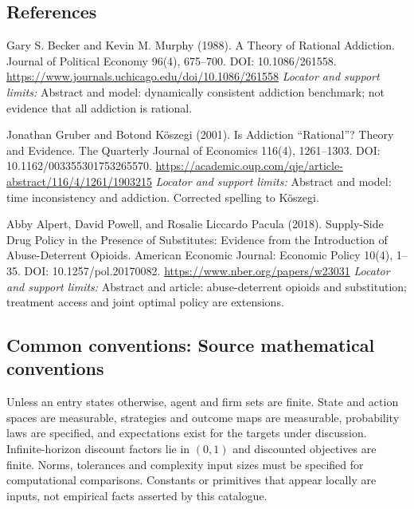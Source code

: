 \documentclass[11pt,a4paper]{article}
\begin{document}
\subsection*{References}
\begin{enumerate}[label={[S\arabic*]},leftmargin=*,itemsep=0.6em]
\item Gary S. Becker and Kevin M. Murphy (1988). A Theory of Rational Addiction. Journal of Political Economy 96(4), 675--700. DOI: 10.1086/261558.
\url{https://www.journals.uchicago.edu/doi/10.1086/261558}
\newline\emph{Locator and support limits:} Abstract and model: dynamically consistent addiction benchmark; not evidence that all addiction is rational.
\item Jonathan Gruber and Botond Köszegi (2001). Is Addiction “Rational”? Theory and Evidence. The Quarterly Journal of Economics 116(4), 1261--1303. DOI: 10.1162/003355301753265570.
\url{https://academic.oup.com/qje/article-abstract/116/4/1261/1903215}
\newline\emph{Locator and support limits:} Abstract and model: time inconsistency and addiction. Corrected spelling to Köszegi.
\item Abby Alpert, David Powell, and Rosalie Liccardo Pacula (2018). Supply-Side Drug Policy in the Presence of Substitutes: Evidence from the Introduction of Abuse-Deterrent Opioids. American Economic Journal: Economic Policy 10(4), 1--35. DOI: 10.1257/pol.20170082.
\url{https://www.nber.org/papers/w23031}
\newline\emph{Locator and support limits:} Abstract and article: abuse-deterrent opioids and substitution; treatment access and joint optimal policy are extensions.
\end{enumerate}

\subsection*{Common conventions: Source mathematical conventions}

Unless an entry states otherwise, agent and firm sets are finite. State and action spaces are measurable, strategies and outcome maps are measurable, probability laws are specified, and expectations exist for the targets under discussion. Infinite-horizon discount factors lie in $(0,1)$ and discounted objectives are finite. Norms, tolerances and complexity input sizes must be specified for computational comparisons. Constants or primitives that appear locally are inputs, not empirical facts asserted by this catalogue.
\end{document}
